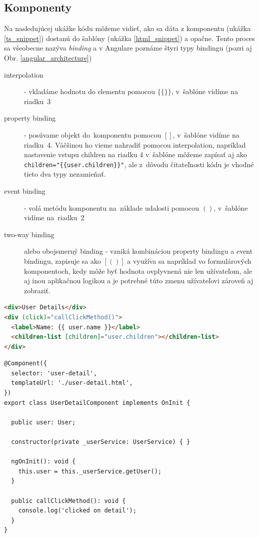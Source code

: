 \documentclass[
  printed, %
  twoside, %
  notable,   %
  nolof,   %
  nolot,   %
]{fithesis3}
\begin{document}
\subsection{Komponenty}
Na nasledujúcej ukážke kódu môžeme vidieť, ako sa dáta z komponentu (ukážka \ref{ts_snippet}) dostanú do šablóny (ukážka \ref{html_snippet}) a opačne. Tento proces sa všeobecne nazýva \textit{binding} a v Angulare poznáme štyri typy bindingu (pozri aj Obr. \ref{angular_architecture})
\begin{description}
\item[interpolation] - vkladáme hodnotu do elementu pomocou $\{\{\}\}$, v~šablóne vidíme na riadku~3
\item[property binding] - posúvame objekt do~komponentu pomocou $[ ]$, v~šablóne vidíme na riadku~4. Väčšinou ho vieme nahradiť pomocou interpolation, napríklad nastavenie vstupu children na riadku 4 v~šablóne môžeme zapísať aj ako\\
\texttt{children="\{\{user.children\}\}"}, ale z~dôvodu čitateľnosti kódu je vhodné tieto dva typy nezamieňať.
\item[event binding] - volá metódu komponentu na~základe udalosti pomocou $()$, v~šablóne vidíme na~riadku~2
\item[two-way binding] alebo obojsmerný binding - vzniká kombináciou property bindingu a event bindingu, zapisuje sa ako $[( )]$ a využíva sa napríklad vo formulárových komponentoch, kedy môže byť hodnota ovplyvnená nie len užívateľom, ale aj inou aplikačnou logikou a je potrebné túto zmenu užívateľovi zároveň aj zobraziť.
\end{description}

\pagebreak

\begin{lstlisting}[language=HTML,caption={HTML šablóna (template) \textit{user-detail.html}},captionpos=b,label=html_snippet]
<div>User Details</div>
<div (click)="callClickMethod()">
  <label>Name: {{ user.name }}</label>
  <children-list [children]="user.children"></children-list>
</div>
\end{lstlisting}

\begin{lstlisting}[caption={Komponent UserDetail},captionpos=b,label=ts_snippet]
@Component({
  selector: 'user-detail',
  templateUrl: './user-detail.html',
})
export class UserDetailComponent implements OnInit {

  public user: User;

  constructor(private _userService: UserService) { }

  ngOnInit(): void {
    this.user = this._userService.getUser();
  }
  
  public callClickMethod(): void {
    console.log('clicked on detail');
  }
}
\end{lstlisting}
\end{document}
